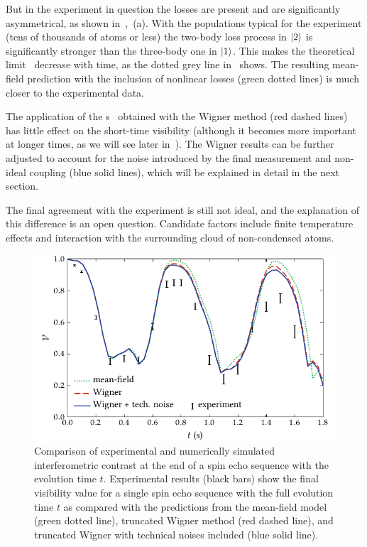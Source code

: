 But in the experiment in question the losses are present and are significantly asymmetrical, as shown in~,~(a).
With the populations typical for the experiment (tens of thousands of atoms or less) the two-body loss process in $\mbox{\ensuremath{\left\vert 2 \right\rangle}}$ is significantly stronger than the three-body one in $\mbox{\ensuremath{\left\vert 1 \right\rangle}}$.
This makes the theoretical limit~ decrease with time, as the dotted grey line in~ shows.
The resulting mean-field prediction with the inclusion of nonlinear losses (green dotted lines) is much closer to the experimental data.

The application of the s~ obtained with the Wigner method (red dashed lines) has little effect on the short-time visibility (although it becomes more important at longer times, as we will see later in~).
The Wigner results can be further adjusted to account for the noise introduced by the final measurement and non-ideal coupling (blue solid lines), which will be explained in detail in the next section.

The final agreement with the experiment is still not ideal, and the explanation of this difference is an open question.
Candidate factors include finite temperature effects and interaction with the surrounding cloud of non-condensed atoms.

\begin{figure}
    \centerline{\includegraphics{figures_generated/bec_noise/echo_visibility_short.pdf}}

    \caption[Experimental and numerically simulated interferometric constrast in spin echo sequence]{
    Comparison of experimental and numerically simulated interferometric contrast at the end of a spin echo sequence with the evolution time $t$.
    Experimental results (black bars) show the final visibility value for a single spin echo sequence with the full evolution time $t$ as compared with the predictions from the mean-field model (green dotted line), truncated Wigner method (red dashed line), and truncated Wigner with technical noises included (blue solid line).}%

    \label{fig:bec-noise:visibility:echo-visibility}
\end{figure}

